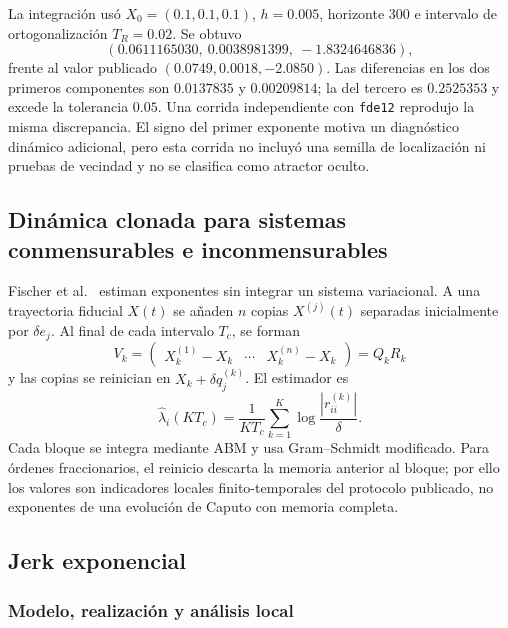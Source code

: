 La integración usó \(X_0=(0.1,0.1,0.1)\), \(h=0.005\), horizonte \(300\) e
intervalo de ortogonalización \(T_R=0.02\). Se obtuvo
\begin{equation}
 (0.0611165030,\ 0.0038981399,\ -1.8324646836),
\end{equation}
frente al valor publicado \((0.0749,0.0018,-2.0850)\). Las diferencias en los
dos primeros componentes son \(0.0137835\) y \(0.00209814\); la del tercero es
\(0.2525353\) y excede la tolerancia \(0.05\). Una corrida independiente con
\texttt{fde12} reprodujo la misma discrepancia. El signo del primer exponente
motiva un diagnóstico dinámico adicional, pero esta corrida no incluyó una
semilla de localización ni pruebas de vecindad y no se clasifica como atractor
oculto.

\subsection{Dinámica clonada para sistemas conmensurables e inconmensurables}

Fischer et al.~\cite{fischer2020} estiman exponentes sin integrar un sistema
variacional. A una trayectoria fiducial \(X(t)\) se añaden \(n\) copias
\(X^{(j)}(t)\) separadas inicialmente por
\(\delta e_j\). Al final de cada intervalo \(T_c\), se forman
\begin{equation}
 V_k=\begin{pmatrix}
 X_k^{(1)}-X_k&\cdots&X_k^{(n)}-X_k
 \end{pmatrix}=Q_kR_k
\end{equation}
y las copias se reinician en \(X_k+\delta q_j^{(k)}\). El estimador es
\begin{equation}
 \widehat\lambda_i(KT_c)=\frac{1}{KT_c}
 \sum_{k=1}^{K}\log\frac{|r_{ii}^{(k)}|}{\delta}.
 \label{ncbench:eq:cloned}
\end{equation}
Cada bloque se integra mediante ABM y usa Gram--Schmidt modificado.
Para órdenes fraccionarios, el reinicio descarta la memoria anterior al bloque;
por ello los valores son indicadores locales finito-temporales del protocolo
publicado, no exponentes de una evolución de Caputo con memoria completa.

\subsection{Jerk exponencial}

\subsubsection*{Modelo, realización y análisis local}

